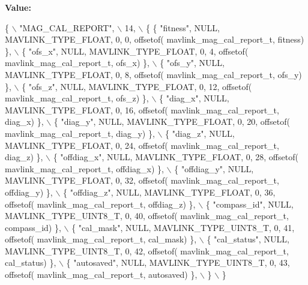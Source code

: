 {\bfseries Value\+:}
\begin{DoxyCode}
\{ \(\backslash\)
    \textcolor{stringliteral}{"MAG\_CAL\_REPORT"}, \(\backslash\)
    14, \(\backslash\)
    \{  \{ \textcolor{stringliteral}{"fitness"}, NULL, MAVLINK_TYPE_FLOAT, 0, 0, offsetof(
      mavlink_mag_cal_report_t, fitness) \}, \(\backslash\)
         \{ \textcolor{stringliteral}{"ofs\_x"}, NULL, MAVLINK_TYPE_FLOAT, 0, 4, offsetof(
      mavlink_mag_cal_report_t, ofs\_x) \}, \(\backslash\)
         \{ \textcolor{stringliteral}{"ofs\_y"}, NULL, MAVLINK_TYPE_FLOAT, 0, 8, offsetof(
      mavlink_mag_cal_report_t, ofs\_y) \}, \(\backslash\)
         \{ \textcolor{stringliteral}{"ofs\_z"}, NULL, MAVLINK_TYPE_FLOAT, 0, 12, offsetof(
      mavlink_mag_cal_report_t, ofs\_z) \}, \(\backslash\)
         \{ \textcolor{stringliteral}{"diag\_x"}, NULL, MAVLINK_TYPE_FLOAT, 0, 16, offsetof(
      mavlink_mag_cal_report_t, diag\_x) \}, \(\backslash\)
         \{ \textcolor{stringliteral}{"diag\_y"}, NULL, MAVLINK_TYPE_FLOAT, 0, 20, offsetof(
      mavlink_mag_cal_report_t, diag\_y) \}, \(\backslash\)
         \{ \textcolor{stringliteral}{"diag\_z"}, NULL, MAVLINK_TYPE_FLOAT, 0, 24, offsetof(
      mavlink_mag_cal_report_t, diag\_z) \}, \(\backslash\)
         \{ \textcolor{stringliteral}{"offdiag\_x"}, NULL, MAVLINK_TYPE_FLOAT, 0, 28, offsetof(
      mavlink_mag_cal_report_t, offdiag\_x) \}, \(\backslash\)
         \{ \textcolor{stringliteral}{"offdiag\_y"}, NULL, MAVLINK_TYPE_FLOAT, 0, 32, offsetof(
      mavlink_mag_cal_report_t, offdiag\_y) \}, \(\backslash\)
         \{ \textcolor{stringliteral}{"offdiag\_z"}, NULL, MAVLINK_TYPE_FLOAT, 0, 36, offsetof(
      mavlink_mag_cal_report_t, offdiag\_z) \}, \(\backslash\)
         \{ \textcolor{stringliteral}{"compass\_id"}, NULL, MAVLINK_TYPE_UINT8_T, 0, 40, offsetof(
      mavlink_mag_cal_report_t, compass\_id) \}, \(\backslash\)
         \{ \textcolor{stringliteral}{"cal\_mask"}, NULL, MAVLINK_TYPE_UINT8_T, 0, 41, offsetof(
      mavlink_mag_cal_report_t, cal\_mask) \}, \(\backslash\)
         \{ \textcolor{stringliteral}{"cal\_status"}, NULL, MAVLINK_TYPE_UINT8_T, 0, 42, offsetof(
      mavlink_mag_cal_report_t, cal\_status) \}, \(\backslash\)
         \{ \textcolor{stringliteral}{"autosaved"}, NULL, MAVLINK_TYPE_UINT8_T, 0, 43, offsetof(
      mavlink_mag_cal_report_t, autosaved) \}, \(\backslash\)
         \} \(\backslash\)
\}
\end{DoxyCode}
\mbox{\label{mavlink__msg__mag__cal__report_8h_ae0cf82eef8ec70e8d38e0dacd23cc912}} 
